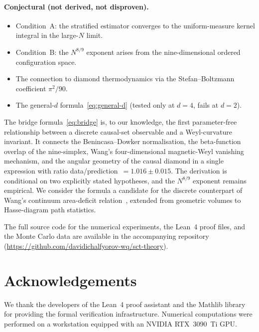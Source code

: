 \documentclass[12pt,a4paper]{article}
\theoremstyle{plain}
\theoremstyle{definition}
\theoremstyle{remark}
\begin{document}
\paragraph{Conjectural (not derived, not disproven).}
\begin{itemize}
\item Condition~A: the stratified estimator converges to the
  uniform-measure kernel integral in the large-$N$ limit.
\item Condition~B: the $N^{8/9}$ exponent arises from the
  nine-dimensional ordered configuration space.
\item The connection to diamond thermodynamics via the
  Stefan--Boltzmann coefficient $\pi^2/90$.
\item The general-$d$ formula~\eqref{eq:general-d} (tested only
  at $d = 4$, fails at $d = 2$).
\end{itemize}

\bigskip

The bridge formula~\eqref{eq:bridge} is, to our knowledge, the
first parameter-free relationship between a discrete causal-set
observable and a Weyl-curvature invariant.  It connects the
Benincasa--Dowker normalisation, the beta-function overlap of the
nine-simplex, Wang's four-dimensional magnetic-Weyl vanishing
mechanism, and the angular geometry of the causal diamond in a
single expression with ratio data/prediction~$= 1.016 \pm 0.015$.
The derivation is conditional on two explicitly stated hypotheses,
and the $N^{8/9}$ exponent remains empirical.  We consider the
formula a candidate for the discrete counterpart of Wang's
continuum area-deficit relation~\cite{Wang:2019}, extended from
geometric volumes to Hasse-diagram path statistics.

The full source code for the numerical experiments, the Lean~4
proof files, and the Monte Carlo data are available in the
accompanying repository~\cite{Alfyorov:2026repo}
(\url{https://github.com/davidichalfyorov-wq/sct-theory}).

\section*{Acknowledgements}

We thank the developers of the Lean~4 proof assistant and the
Mathlib library for providing the formal verification
infrastructure.  Numerical computations were performed on a
workstation equipped with an NVIDIA RTX~3090~Ti GPU.
\end{document}
